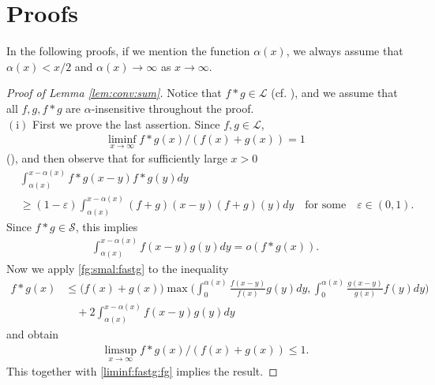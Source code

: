 \documentclass[12pt,leqno]{amsart}
\newcommand{\vep}{\varepsilon}
\newcommand{\cals}{{\mathcal S}}
\newcommand{\call}{{\mathcal L}}
\newcommand{\1}{{\mathbf 1}}
\begin{document}
\section{Proofs}
\label{proofs}
In the following proofs, if we mention the function $\alpha(x)$, we always assume that $\alpha(x)<x/2$ and $\alpha(x)\to\infty$ as $x\to\infty$. 
\begin{proof}[Proof of Lemma \ref{lem:conv:sum}]
Notice that $f\ast g\in \call$ (cf. \cite[Theorem 4.3]{Foss:Korshunov:Zachary:2013}), and we assume that all $f,g,f\ast g$ are $\alpha$-insensitive 
throughout the proof. \\ %
$(\mathrm{i})$ First we prove the last assertion. 
Since $f,g \in \call$, 
\begin{align}
\label{liminf:fastg:fg}
 \liminf_{x\to\infty}  f\ast g(x)/(f(x)+g(x))=1
\end{align}
(\cite[Theorem 4.2]{Foss:Korshunov:Zachary:2013}), and then observe that for sufficiently large $x>0$ 
\begin{align*}
& \int_{\alpha(x)}^{x-\alpha(x)} f\ast g (x-y) f\ast g (y)dy \\
&\ge (1-\vep) \int_{\alpha(x)}^{x-\alpha(x)} 
(f+g)(x-y)(f+g)(y) dy \quad \text{for some}\quad \vep \in(0,1).
\end{align*}
Since $f\ast g\in \cals$, this implies 
\begin{align}
\label{fg:smal:fastg}
 \int_{\alpha(x)}^{x-\alpha(x)} 
f(x-y) g(y) dy=o(f\ast g (x)).  
\end{align}
Now we apply \eqref{fg:smal:fastg} to the inequality 
\begin{align*}
 f\ast g(x) &\le \big(f(x)+g(x)\big) \max\Big(
\int_0^{\alpha(x)} \frac{f(x-y)}{f(x)}g(y)dy, \int_0^{\alpha(x)} \frac{g(x-y)}{g(x)}f(y)dy
\Big) \\
&\quad + 2 \int_{\alpha(x)}^{x-\alpha(x)} f(x-y) g (y)dy 
\end{align*}
and obtain  
\begin{align}
\label{limsup:fastg:f+g}
 \limsup_{x\to\infty} f\ast g(x)/(f(x)+g(x)) \le 1.
\end{align}
This together with \eqref{liminf:fastg:fg} implies the result.



\end{proof}
\end{document}
